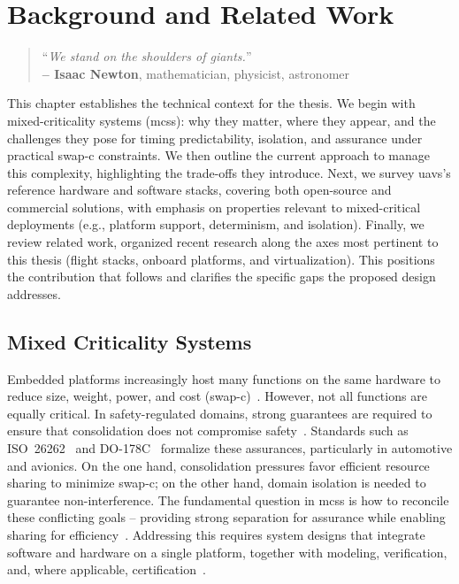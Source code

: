 %
\chapter{Background and Related Work}%
\label{ch:state-art}
%
\begin{quote}
\begin{flushright}
``\emph{We stand on the shoulders of giants.}'' \\
\textbf{-- Isaac Newton}, mathematician, physicist, astronomer
\end{flushright}
\end{quote}

This chapter establishes the technical context for the thesis. We begin with mixed-criticality systems (\glspl{mcs}): why they matter, where they appear, and the challenges they pose for timing predictability, isolation, and assurance under practical \gls{swap-c} constraints. We then outline the current approach to manage this complexity, highlighting the trade-offs they introduce.
%
Next, we survey \glspl{uav}'s reference hardware and software
stacks, covering both open-source and commercial solutions, with emphasis on
properties relevant to mixed-critical deployments (e.g., platform support,
determinism, and isolation).
%
Finally, we review related work, organized recent research along the axes most
pertinent to this thesis (flight stacks, onboard platforms, and
virtualization). This positions the contribution that follows and clarifies the
specific gaps the proposed design addresses.

\section{Mixed Criticality Systems}%
\label{sec:mixed-crit-syst}
Embedded platforms increasingly host many functions on the same hardware to
reduce size, weight, power, and cost (\gls{swap-c})~\cite{burns2022mixed}.
However, not all functions are equally critical. In safety-regulated domains,
strong guarantees are required to ensure that consolidation does not compromise
safety~\cite{burns2022mixed,davis_mixed_2018}.
%
Standards such as ISO~26262~\cite{iso26262} and DO-178C~\cite{sc_167_software_1992}
formalize these assurances, particularly in automotive and avionics.
On the one hand, consolidation pressures favor efficient resource sharing to
minimize \gls{swap-c}; on the other hand, domain isolation is needed to
guarantee non-interference. The fundamental question in \glspl{mcs} is how to
reconcile these conflicting goals -- providing strong separation for assurance
while enabling sharing for efficiency~\cite{burns2022mixed}. Addressing this
requires system designs that integrate software and hardware on a single
platform, together with modeling, verification, and, where applicable,
certification~\cite{davis_mixed_2018,youn_software_2015}.

